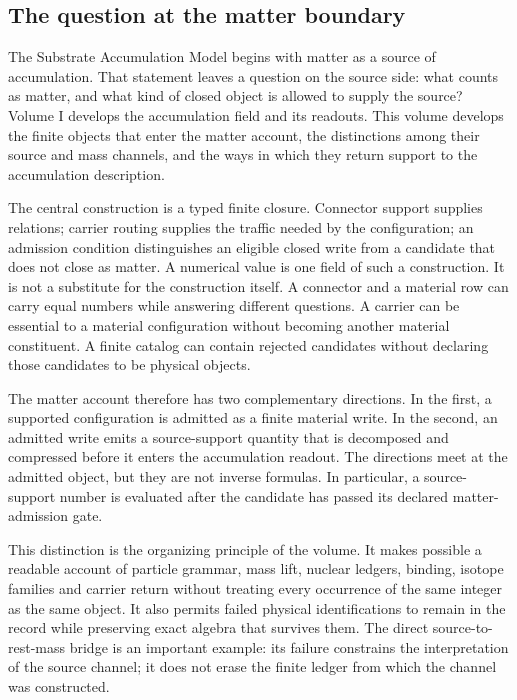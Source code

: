 \label{sec:vii-foundations}

\subsection{The question at the matter boundary}

The Substrate Accumulation Model begins with matter as a source of accumulation. That statement leaves a question on the source side: what counts as matter, and what kind of closed object is allowed to supply the source? Volume I develops the accumulation field and its readouts. This volume develops the finite objects that enter the matter account, the distinctions among their source and mass channels, and the ways in which they return support to the accumulation description.

The central construction is a typed finite closure. Connector support supplies relations; carrier routing supplies the traffic needed by the configuration; an admission condition distinguishes an eligible closed write from a candidate that does not close as matter. A numerical value is one field of such a construction. It is not a substitute for the construction itself. A connector and a material row can carry equal numbers while answering different questions. A carrier can be essential to a material configuration without becoming another material constituent. A finite catalog can contain rejected candidates without declaring those candidates to be physical objects.

The matter account therefore has two complementary directions. In the first, a supported configuration is admitted as a finite material write. In the second, an admitted write emits a source-support quantity that is decomposed and compressed before it enters the accumulation readout. The directions meet at the admitted object, but they are not inverse formulas. In particular, a source-support number is evaluated after the candidate has passed its declared matter-admission gate.

This distinction is the organizing principle of the volume. It makes possible a readable account of particle grammar, mass lift, nuclear ledgers, binding, isotope families and carrier return without treating every occurrence of the same integer as the same object. It also permits failed physical identifications to remain in the record while preserving exact algebra that survives them. The direct source-to-rest-mass bridge is an important example: its failure constrains the interpretation of the source channel; it does not erase the finite ledger from which the channel was constructed.\cite{viisama,viispine}

